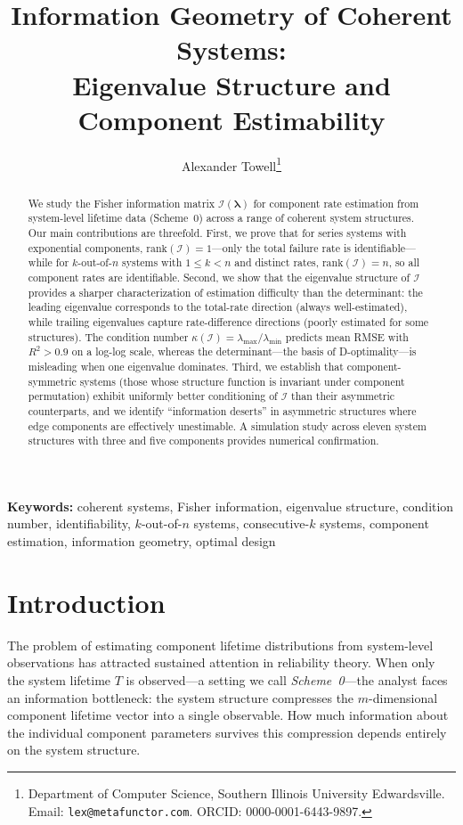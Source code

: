 \documentclass[12pt]{article}
\title{Information Geometry of Coherent Systems:\\
       Eigenvalue Structure and Component Estimability}
\author{Alexander Towell\thanks{Department of Computer Science,
  Southern Illinois University Edwardsville.
  Email: \texttt{lex@metafunctor.com}.
  ORCID: 0000-0001-6443-9897.}}
\date{}
\theoremstyle{definition}
\theoremstyle{remark}
\newcommand{\rank}{\mathrm{rank}}
\newcommand{\blam}{\boldsymbol{\lambda}}
\begin{document}
\maketitle

\begin{abstract}
We study the Fisher information matrix $\mathcal{I}(\blam)$ for
component rate estimation from system-level lifetime data (Scheme~0)
across a range of coherent system structures.  Our main contributions
are threefold.  First, we prove that for series systems with
exponential components, $\rank(\mathcal{I}) = 1$---only the total
failure rate is identifiable---while for $k$-out-of-$n$ systems with
$1 \leq k < n$ and distinct rates, $\rank(\mathcal{I}) = n$, so all
component rates are identifiable.  Second, we show that the eigenvalue
structure of $\mathcal{I}$ provides a sharper characterization of
estimation difficulty than the determinant: the leading eigenvalue
corresponds to the total-rate direction (always well-estimated), while
trailing eigenvalues capture rate-difference directions (poorly
estimated for some structures).  The condition number
$\kappa(\mathcal{I}) = \lambda_{\max}/\lambda_{\min}$ predicts
mean RMSE with $R^2 > 0.9$ on a log-log scale, whereas the
determinant---the basis of D-optimality---is misleading when one
eigenvalue dominates.  Third, we establish that component-symmetric
systems (those whose structure function is invariant under component
permutation) exhibit uniformly better conditioning of $\mathcal{I}$
than their asymmetric counterparts, and we identify ``information
deserts'' in asymmetric structures where edge components are
effectively unestimable.  A simulation study across eleven system
structures with three and five components provides numerical
confirmation.
\end{abstract}

\noindent\textbf{Keywords:} coherent systems, Fisher information,
eigenvalue structure, condition number, identifiability, $k$-out-of-$n$
systems, consecutive-$k$ systems, component estimation, information
geometry, optimal design

\section{Introduction}
\label{sec:introduction}

The problem of estimating component lifetime distributions from
system-level observations has attracted sustained attention in
reliability theory.  When only the system lifetime $T$ is observed---a
setting we call \emph{Scheme~0}---the analyst faces an information
bottleneck: the system structure compresses the $m$-dimensional
component lifetime vector into a single observable.  How much
information about the individual component parameters survives this
compression depends entirely on the system structure.
\end{document}
